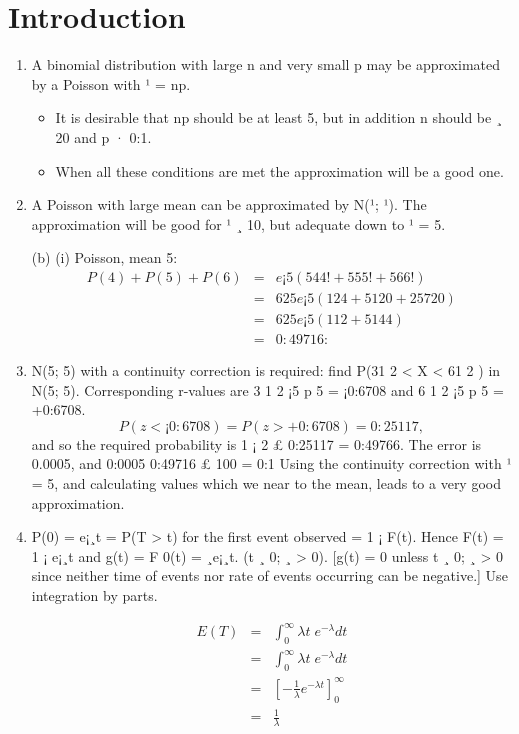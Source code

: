 \documentclass[a4paper,12pt]{article}
\begin{document}
\section{Introduction}
\begin{enumerate}
\item A binomial distribution with large n and very small p may be approximated
by a Poisson with ¹ = np. 
\begin{itemize}
\item It is desirable that np should be at least 5, but in
addition n should be ¸ 20 and p · 0:1. 
\item When all these conditions are met
the approximation will be a good one.
\end{itemize}

\item  A Poisson with large mean can be approximated by N(¹; ¹). The
approximation will be good for ¹ ¸ 10, but adequate down to ¹ = 5.

(b) (i) Poisson, mean 5:
\begin{eqnarray*}
P(4) + P(5) + P(6) &=& 
e¡5( 54
4! + 55
5! + 56
6! )\\
&=& 625e¡5( 1
24 + 5
120 + 25
720 )\\ &=& 625e¡5( 1
12 + 5
144 )\\ &=& 0:49716:
\end{eqnarray*}
\item  N(5; 5) with a continuity correction is required: find P(31
2 < X < 61
2 ) in
N(5; 5). Corresponding r-values are 3 1
2
¡5
p
5
= ¡0:6708 and 6 1
2
¡5
p
5
= +0:6708.
\[P(z < ¡0:6708) = P(z > +0:6708) = 0:25117,\] and so the required probability
is 1 ¡ 2 £ 0:25117 = 0:49766. The error is 0.0005, and %
0:0005
0:49716 £ 100 = 0:1%
Using the continuity correction with ¹ = 5, and calculating values which we
near to the mean, leads to a very good approximation.
\item  P(0) = e¡¸t = P(T > t) for the first event observed = 1 ¡ F(t). Hence
F(t) = 1 ¡ e¡¸t and g(t) = F
0(t) = ¸e¡¸t. (t ¸ 0; ¸ > 0).
[g(t) = 0 unless t ¸ 0; ¸ > 0 since neither time of events nor rate of events
occurring can be negative.] Use integration by parts.


\begin{eqnarray*}
E(T) &=& \int^{\infty}_{0} \lambda t\;e^{-\lambda} dt \\
    &=&\int^{\infty}_{0} \lambda t\;e^{-\lambda} dt \\
    &=& \left[ -\frac{1}{\lambda}e^{-\lambda t} \right]^{\infty}_{0}\\
    &=& \frac{1}{\lambda}  
\end{eqnarray*}


\end{enumerate}
\end{document}
